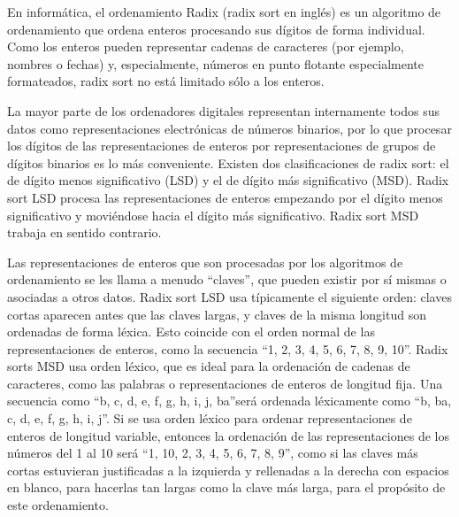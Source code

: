 En informática, el ordenamiento Radix (radix sort en inglés) es un algoritmo de ordenamiento que ordena enteros procesando sus dígitos de forma individual. Como los enteros pueden representar cadenas de caracteres (por ejemplo, nombres o fechas) y, especialmente, números en punto flotante especialmente formateados, radix sort no está limitado sólo a los enteros.

La mayor parte de los ordenadores digitales representan internamente todos sus datos como representaciones electrónicas de números binarios, por lo que procesar los dígitos de las representaciones de enteros por representaciones de grupos de dígitos binarios es lo más conveniente. Existen dos clasificaciones de radix sort: el de dígito menos significativo (LSD) y el de dígito más significativo (MSD). Radix sort LSD procesa las representaciones de enteros empezando por el dígito menos significativo y moviéndose hacia el dígito más significativo. Radix sort MSD trabaja en sentido contrario.

Las representaciones de enteros que son procesadas por los algoritmos de ordenamiento se les llama a menudo \textquotedblleft claves\textquotedblright, que pueden existir por sí mismas o asociadas a otros datos. Radix sort LSD usa típicamente el siguiente orden: claves cortas aparecen antes que las claves largas, y claves de la misma longitud son ordenadas de forma léxica. Esto coincide con el orden normal de las representaciones de enteros, como la secuencia \textquotedblleft 1, 2, 3, 4, 5, 6, 7, 8, 9, 10\textquotedblright. Radix sorts MSD usa orden léxico, que es ideal para la ordenación de cadenas de caracteres, como las palabras o representaciones de enteros de longitud fija. Una secuencia como \textquotedblleft b, c, d, e, f, g, h, i, j, ba\textquotedblright será ordenada léxicamente como  \textquotedblleft b, ba, c, d, e, f, g, h, i, j\textquotedblright. Si se usa orden léxico para ordenar representaciones de enteros de longitud variable, entonces la ordenación de las representaciones de los números del 1 al 10 será \textquotedblleft 1, 10, 2, 3, 4, 5, 6, 7, 8, 9\textquotedblright, como si las claves más cortas estuvieran justificadas a la izquierda y rellenadas a la derecha con espacios en blanco, para hacerlas tan largas como la clave más larga, para el propósito de este ordenamiento.